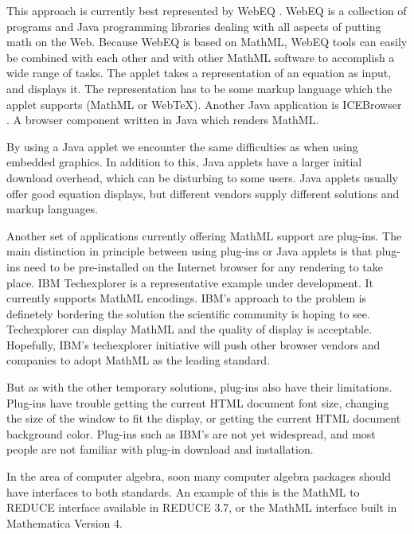 This approach is currently best represented by WebEQ \cite{webeq}. WebEQ is a collection of programs and Java
programming libraries dealing with all aspects of putting math on the Web.  Because WebEQ is based on MathML,
WebEQ tools can easily be combined with each other and with other MathML software to accomplish a wide range of tasks.
The applet takes a representation of an equation as input, and displays it. The representation has to be some markup language which the applet
supports (MathML or Web\TeX{}). Another Java application is ICEBrowser \cite{ice}. A browser component
written in Java which renders MathML.

By using a Java applet we encounter the same difficulties as when using embedded graphics. In addition to
this, Java applets have a larger initial download overhead, which can be disturbing to some users.
Java applets usually offer good equation displays, but different vendors supply different solutions and markup
languages.

Another set of applications currently offering MathML support are plug-ins. The main distinction in principle between
using plug-ins or Java applets is that plug-ins need to be pre-installed on the Internet browser for any
rendering to take place. IBM Techexplorer \cite{ibm} is a representative example under
development. It currently supports MathML encodings. IBM's approach to the problem is definetely
bordering the solution the scientific community is hoping to see. Techexplorer can display MathML and the
quality of display is acceptable. Hopefully, IBM's techexplorer initiative will push other browser vendors and
companies to adopt MathML as the leading standard.

But as with the other temporary solutions, plug-ins also have their limitations. 
Plug-ins have trouble getting the current HTML document font size, changing the size of the window to fit the display, or getting the current HTML document background color. Plug-ins such as IBM's are not
yet widespread, and most people are not familiar with plug-in download and installation.

In the area of computer algebra, soon many computer algebra packages should have interfaces to both standards. An example
of this is the MathML to REDUCE interface available in REDUCE 3.7, or the MathML
interface built in Mathematica Version 4.

